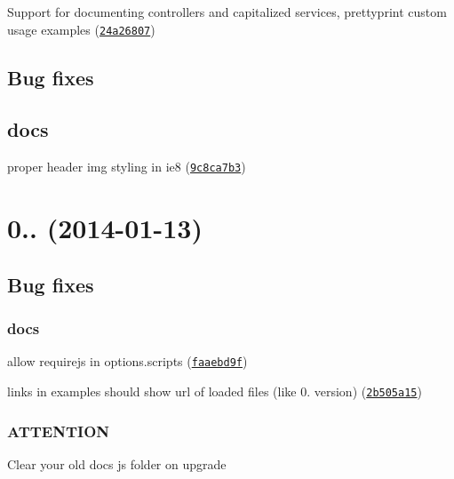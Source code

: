 \begin{DoxyItemize}
\item Support for documenting controllers and capitalized services, prettyprint custom usage examples (\href{https://github.com/m7r/grunt-ngdocs/commit/24a26807}{\tt 24a26807})
\end{DoxyItemize}

\subsection*{Bug fixes}

\subsection*{docs}


\begin{DoxyItemize}
\item proper header img styling in ie8 (\href{https://github.com/m7r/grunt-ngdocs/commit/9c8ca7b3}{\tt 9c8ca7b3})
\end{DoxyItemize}

\section*{0.. (2014-\/01-\/13)}

\subsection*{Bug fixes}

\subsubsection*{docs}


\begin{DoxyItemize}
\item allow requirejs in options.\+scripts (\href{https://github.com/m7r/grunt-ngdocs/commit/faaebd9f}{\tt faaebd9f})
\item links in examples should show url of loaded files (like 0. version) (\href{https://github.com/m7r/grunt-ngdocs/commit/2b505a15}{\tt 2b505a15})
\end{DoxyItemize}

\subsubsection*{A\+T\+T\+E\+N\+T\+I\+O\+N}

Clear your old docs js folder on upgrade

